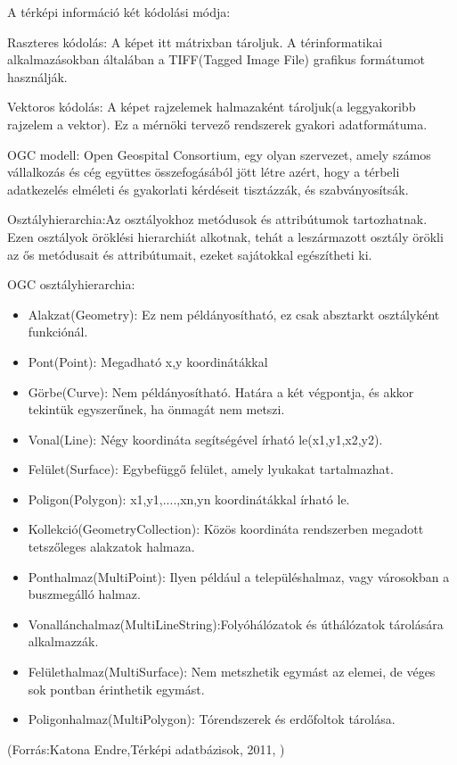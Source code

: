 A térképi információ két kódolási módja:

Raszteres kódolás: A képet itt mátrixban tároljuk. A térinformatikai alkalmazásokban általában a TIFF(Tagged Image File) grafikus formátumot használják.


Vektoros kódolás: A képet rajzelemek halmazaként tároljuk(a leggyakoribb rajzelem a vektor). Ez a mérnöki tervező rendszerek gyakori adatformátuma.

OGC modell: Open Geospital Consortium, egy olyan szervezet, amely számos vállalkozás és cég együttes összefogásából jött létre azért, hogy a térbeli adatkezelés elméleti és gyakorlati kérdéseit tisztázzák, és szabványosítsák. 

Osztályhierarchia:Az osztályokhoz metódusok és attribútumok tartozhatnak. Ezen osztályok öröklési hierarchiát alkotnak, tehát a leszármazott osztály örökli az ős metódusait és attribútumait, ezeket sajátokkal egészítheti ki. 

OGC osztályhierarchia:
\begin{itemize}  
\item Alakzat(Geometry): Ez nem példányosítható, ez csak absztarkt osztályként funkciónál.
\item Pont(Point): Megadható x,y koordinátákkal
\item Görbe(Curve): Nem példányosítható. Határa a két végpontja, és akkor tekintük egyszerűnek, ha önmagát nem metszi.
\item Vonal(Line): Négy koordináta segítségével írható le(x1,y1,x2,y2).
\item Felület(Surface): Egybefüggő felület, amely lyukakat tartalmazhat.
\item Poligon(Polygon): x1,y1,....,xn,yn koordinátákkal írható le.
\item Kollekció(GeometryCollection): Közös koordináta rendszerben megadott tetszőleges alakzatok halmaza.
\item Ponthalmaz(MultiPoint): Ilyen például a településhalmaz, vagy városokban a buszmegálló halmaz. 
\item Vonallánchalmaz(MultiLineString):Folyóhálózatok és úthálózatok tárolására alkalmazzák.
\item Felülethalmaz(MultiSurface): Nem metszhetik egymást az elemei, de véges sok pontban érinthetik egymást.
\item Poligonhalmaz(MultiPolygon): Tórendszerek és erdőfoltok tárolása.
\end{itemize}

(Forrás:Katona Endre,Térképi adatbázisok, 2011, )



